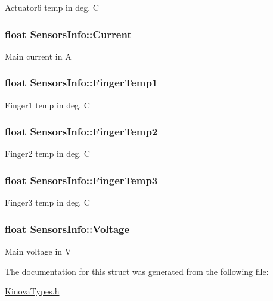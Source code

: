 Actuator6 temp in deg. C \hypertarget{struct_sensors_info_a2be7e431dce5a2093e6f61a7333b574c}{
\subsubsection[{Current}]{\setlength{\rightskip}{0pt plus 5cm}float Sensors\-Info\-::\-Current}}\label{struct_sensors_info_a2be7e431dce5a2093e6f61a7333b574c}
Main current in A \hypertarget{struct_sensors_info_a752833e7fba2c791ecf2693b96cff3d0}{
\subsubsection[{Finger\-Temp1}]{\setlength{\rightskip}{0pt plus 5cm}float Sensors\-Info\-::\-Finger\-Temp1}}\label{struct_sensors_info_a752833e7fba2c791ecf2693b96cff3d0}
Finger1 temp in deg. C \hypertarget{struct_sensors_info_a97f570d85f99948f785551712da25145}{
\subsubsection[{Finger\-Temp2}]{\setlength{\rightskip}{0pt plus 5cm}float Sensors\-Info\-::\-Finger\-Temp2}}\label{struct_sensors_info_a97f570d85f99948f785551712da25145}
Finger2 temp in deg. C \hypertarget{struct_sensors_info_ad18fa2c352189db0a8aff1d38c1c7b52}{
\subsubsection[{Finger\-Temp3}]{\setlength{\rightskip}{0pt plus 5cm}float Sensors\-Info\-::\-Finger\-Temp3}}\label{struct_sensors_info_ad18fa2c352189db0a8aff1d38c1c7b52}
Finger3 temp in deg. C \hypertarget{struct_sensors_info_a9ced23ff499026d028b2179945091775}{
\subsubsection[{Voltage}]{\setlength{\rightskip}{0pt plus 5cm}float Sensors\-Info\-::\-Voltage}}\label{struct_sensors_info_a9ced23ff499026d028b2179945091775}
Main voltage in V 

The documentation for this struct was generated from the following file\-:\begin{DoxyCompactItemize}
\item 
\hyperlink{_kinova_types_8h}{Kinova\-Types.\-h}\end{DoxyCompactItemize}
